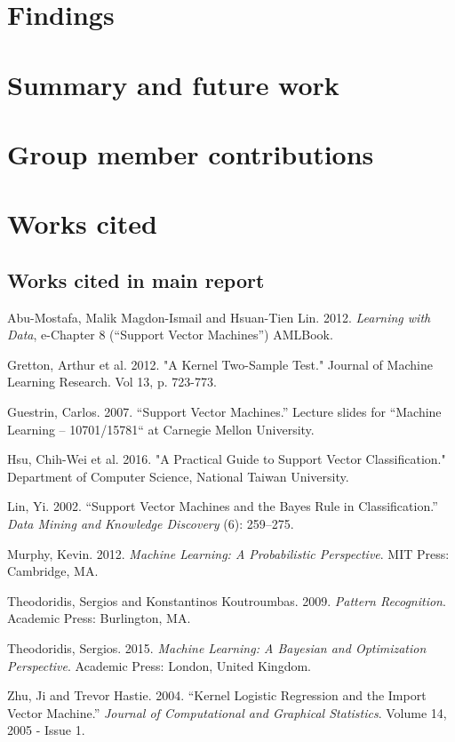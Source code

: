 \documentclass[letterpaper, 11pt]{article}
\begin{document}
\section{Findings}



\section{Summary and future work}

\section{Group member contributions}

\section{Works cited}

\subsection{Works cited in main report}

Abu-Mostafa, Malik Magdon-Ismail and Hsuan-Tien Lin. 2012. \emph{Learning with Data}, e-Chapter 8 (``Support Vector Machines'') AMLBook.

Gretton, Arthur et al. 2012. "A Kernel Two-Sample Test." Journal of Machine Learning Research. Vol 13, p. 723-773.

Guestrin, Carlos. 2007. ``Support Vector Machines.'' Lecture slides for ``Machine Learning – 10701/15781`` at Carnegie Mellon University. 

Hsu, Chih-Wei et al. 2016. "A Practical Guide to Support Vector Classification." Department of Computer Science, National Taiwan University.

Lin, Yi. 2002. ``Support Vector Machines and the Bayes Rule in Classification.'' \emph{Data Mining and Knowledge Discovery} (6): 259–275.

Murphy, Kevin. 2012. \emph{Machine Learning: A Probabilistic Perspective}. MIT Press: Cambridge, MA.

Theodoridis, Sergios and Konstantinos Koutroumbas. 2009. \emph{Pattern Recognition}. Academic Press: Burlington, MA.

Theodoridis, Sergios. 2015. \emph{Machine Learning: A Bayesian and Optimization Perspective}. Academic Press: London, United Kingdom.

Zhu, Ji and Trevor Hastie. 2004. ``Kernel Logistic Regression and the Import Vector Machine.'' \emph{Journal of Computational and Graphical Statistics}.  
Volume 14, 2005 - Issue 1.
\end{document}
